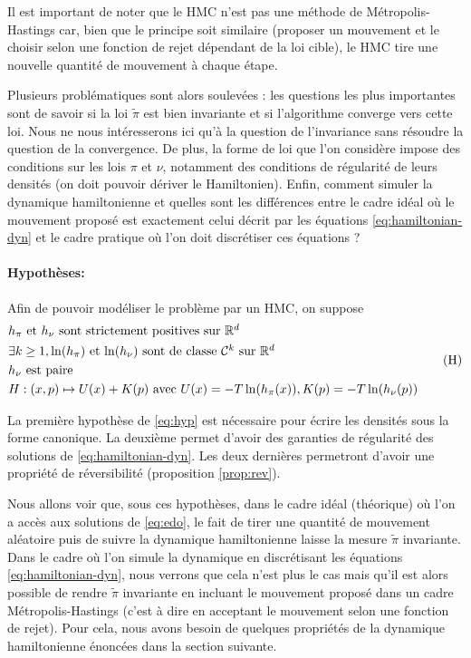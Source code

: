 \documentclass[10pt,a4paper]{article}
\begin{document}
Il est important de noter que le HMC n'est pas une méthode de Métropolis-Hastings car, bien que le principe soit similaire (proposer un mouvement et le choisir selon une fonction de rejet dépendant de la loi cible), le HMC tire une nouvelle quantité de mouvement à chaque étape.

Plusieurs problématiques sont alors soulevées : les questions les plus importantes sont de savoir si la loi $\widetilde{\pi}$ est bien invariante et si l'algorithme converge vers cette loi. Nous ne nous intéresserons ici qu'à la question de l'invariance sans résoudre la question de la convergence. De plus, la forme de loi que l'on considère impose des conditions sur les lois $\pi$ et $\nu$, notamment des conditions de régularité de leurs densités (on doit pouvoir dériver le Hamiltonien). Enfin, comment simuler la dynamique hamiltonienne et quelles sont les différences entre le cadre idéal où le mouvement proposé est exactement celui décrit par les équations \eqref{eq:hamiltonian-dyn} et le cadre pratique où l'on doit discrétiser ces équations ?

\paragraph{Hypothèses:}
Afin de pouvoir modéliser le problème par un HMC, on suppose
\begin{equation}\label{eq:hyp}
	\begin{aligned}
		&\mbox{$h_\pi$ et $h_\nu$ sont strictement positives sur $\mathbb{R}^d$} \\
		&\mbox{$\exists k \geq 1, \ln(h_\pi)$ et $\ln(h_\nu)$ sont de classe $\mathcal{C}^k$ sur $\mathbb{R}^d$}\\
		&\mbox{$h_\nu$ est paire} \\
                & H : (x,p) \mapsto U(x) + K(p) \text{ avec } U(x) = - T \ln(h_\pi(x)), K(p) = -T \ln(h_\nu(p))
	\end{aligned}
	\tag{H}
\end{equation}

\begin{Rque}
	La première hypothèse de \eqref{eq:hyp} est nécessaire pour écrire les densités sous la forme canonique. La deuxième permet d'avoir des garanties de régularité des solutions de \eqref{eq:hamiltonian-dyn}. Les deux dernières permetront d'avoir une propriété de réversibilité (proposition \ref{prop:rev}).
\end{Rque}

Nous allons voir que, sous ces hypothèses, dans le cadre idéal (théorique) où l'on a accès aux solutions de \eqref{eq:edo}, le fait de tirer une quantité de mouvement aléatoire puis de suivre la dynamique hamiltonienne laisse la mesure $\tilde{\pi}$ invariante. Dans le cadre où l'on simule la dynamique en discrétisant les équations \eqref{eq:hamiltonian-dyn}, nous verrons que cela n'est plus le cas mais qu'il est alors possible de rendre $\tilde{\pi}$ invariante en incluant le mouvement proposé dans un cadre Métropolis-Hastings (c'est à dire en acceptant le mouvement selon une fonction de rejet). Pour cela, nous avons besoin de quelques propriétés de la dynamique hamiltonienne énoncées dans la section suivante.
\end{document}
